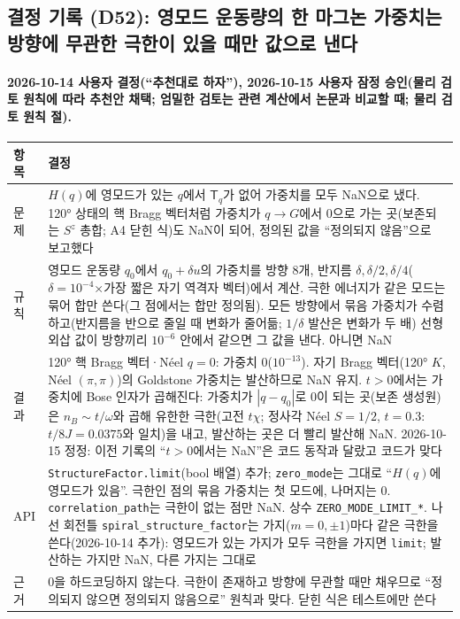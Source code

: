 \subsection{결정 기록 (D52): 영모드 운동량의 한 마그논 가중치는 방향에 무관한 극한이 있을 때만 값으로 낸다}\label{decisions-d52-zero-mode-limit}
\begingroup%
  \framesubtitle{2026-10-14 사용자 결정(``추천대로 하자''), 2026-10-15 사용자 잠정 승인(물리 검토 원칙에 따라 추천안 채택; 엄밀한 검토는 관련 계산에서 논문과 비교할 때; 물리 검토 원칙 절).}
  \small\renewcommand{\arraystretch}{1.12}
  \begin{tabularx}{\textwidth}{@{}P{3.0cm}Y@{}}
    \toprule
    항목 & 결정 \\
    \midrule
    문제 & $H(q)$에 영모드가 있는 $q$에서 $\mathsf T_q$가 없어 가중치를 모두 NaN으로 냈다. 120° 상태의 핵 Bragg 벡터처럼 가중치가 $q\to G$에서 0으로 가는 곳(보존되는 $S^z$ 총합; A4 닫힌 식)도 NaN이 되어, 정의된 값을 ``정의되지 않음''으로 보고했다 \\
    규칙 & 영모드 운동량 $q_0$에서 $q_0+\delta u$의 가중치를 방향 8개, 반지름 $\delta,\delta/2,\delta/4$($\delta=10^{-4}$×가장 짧은 자기 역격자 벡터)에서 계산. 극한 에너지가 같은 모드는 묶어 합만 쓴다(그 점에서는 합만 정의됨). 모든 방향에서 묶음 가중치가 수렴하고(반지름을 반으로 줄일 때 변화가 줄어듦; $1/\delta$ 발산은 변화가 두 배) 선형 외삽 값이 방향끼리 $10^{-6}$ 안에서 같으면 그 값을 낸다. 아니면 NaN \\
    결과 & 120° 핵 Bragg 벡터·Néel $q=0$: 가중치 0($10^{-13}$). 자기 Bragg 벡터(120° $K$, Néel $(\pi,\pi)$)의 Goldstone 가중치는 발산하므로 NaN 유지. $t>0$에서는 가중치에 Bose 인자가 곱해진다: 가중치가 $|q-q_0|$로 0이 되는 곳(보존 생성원)은 $n_B\sim t/\omega$와 곱해 유한한 극한(고전 $t\chi$; 정사각 Néel $S=1/2$, $t=0.3$: $t/8J=0.0375$와 일치)을 내고, 발산하는 곳은 더 빨리 발산해 NaN. 2026-10-15 정정: 이전 기록의 ``$t>0$에서는 NaN''은 코드 동작과 달랐고 코드가 맞다 \\
    API & \texttt{StructureFactor.limit}(bool 배열) 추가; \texttt{zero\_mode}는 그대로 ``$H(q)$에 영모드가 있음''. 극한인 점의 묶음 가중치는 첫 모드에, 나머지는 0. \texttt{correlation\_path}는 극한이 없는 점만 NaN. 상수 \texttt{ZERO\_MODE\_LIMIT\_*}. 나선 회전틀 \texttt{spiral\_structure\_factor}는 가지($m=0,\pm1$)마다 같은 극한을 쓴다(2026-10-14 추가): 영모드가 있는 가지가 모두 극한을 가지면 \texttt{limit}; 발산하는 가지만 NaN, 다른 가지는 그대로 \\
    근거 & 0을 하드코딩하지 않는다. 극한이 존재하고 방향에 무관할 때만 채우므로 ``정의되지 않으면 정의되지 않음으로'' 원칙과 맞다. 닫힌 식은 테스트에만 쓴다 \\
    \bottomrule
  \end{tabularx}
\endgroup


